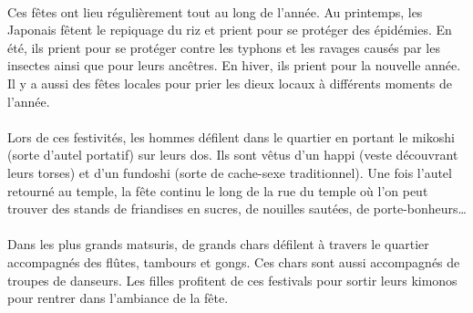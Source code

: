 \paragraph{}
Ces fêtes ont lieu régulièrement tout au long de l’année. Au printemps, les Japonais fêtent le repiquage du riz et prient pour se protéger des épidémies. En été, ils prient pour se protéger contre les typhons et les ravages causés par les insectes ainsi que pour leurs ancêtres.  En hiver, ils prient pour la nouvelle année. Il y a aussi des fêtes locales pour prier les dieux locaux à différents moments de l’année. 
\paragraph{}
Lors de ces festivités, les hommes défilent dans le quartier en portant le mikoshi (sorte d’autel portatif) sur leurs dos. Ils sont vêtus d’un happi (veste découvrant leurs torses) et d’un fundoshi (sorte de cache-sexe traditionnel). Une fois l’autel retourné au temple, la fête continu le long de la rue du temple où l’on peut trouver des stands de friandises en sucres, de nouilles sautées, de porte-bonheurs… 
\paragraph{}
Dans les plus grands matsuris, de grands chars défilent à travers le quartier accompagnés des flûtes, tambours et gongs. Ces chars sont aussi accompagnés de troupes de danseurs. Les filles profitent de ces festivals pour sortir leurs kimonos pour rentrer dans l’ambiance de la fête.

